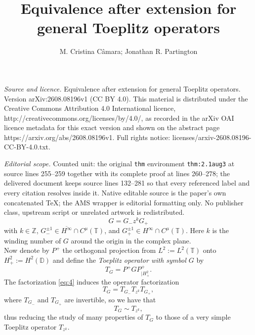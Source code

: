 \documentclass[10pt,a4paper]{amsart}
\def\DD{\mathbb D}
\def\TT{\mathbb T}
\def\ZZ{\mathbb Z}
\def\beq{\begin{equation}}
\def\eeq{\end{equation}}
\def\ol{\overline}
\begin{document}
\title[Equivalence after extension for general Toeplitz operators]{Equivalence after extension for general Toeplitz operators}
\author{M. Cristina Câmara; Jonathan R. Partington}
\date{}
\maketitle
\noindent\emph{Source and licence.} Equivalence after extension for general Toeplitz operators. Version arXiv:2608.08196v1 (CC BY 4.0). This material is distributed under the Creative Commons Attribution 4.0 International licence, http://creativecommons.org/licenses/by/4.0/, as recorded in the arXiv OAI licence metadata for this exact version and shown on the abstract page https://arxiv.org/abs/2608.08196v1. Full rights notice: licenses/arxiv-2608.08196-CC-BY-4.0.txt.\par\smallskip
\noindent\textit{Editorial scope.} Counted unit: the original \texttt{thm} environment \texttt{thm:2.1aug3} at source lines 255--259 together with its complete proof at lines 260--278; the delivered document keeps source lines 132--281 so that every referenced label and every citation resolves inside it. Native editable source is the paper's own concatenated TeX; the AMS wrapper is editorial formatting only. No publisher class, upstream script or unrelated artwork is redistributed.
\beq\label{eq:4}
G= G_- z^k G_+
\eeq
with $k \in \ZZ$, $G^{\pm 1}_- \in \ol{H^\infty} \cap C^\mu(\TT)$, and
$G^{\pm 1}_+ \in H^\infty \cap C^\mu(\TT)$.
Here $k$ is the winding number of $G$ around the origin in the complex plane.\\

Now denote by $P^+$ the orthogonal projection from $L^2:=L^2(\TT)$ onto $H^2_+:= H^2(\DD)$ and define the {\em Toeplitz operator with symbol $G$\/} by
\beq \label{eq:5}
T_G = P^+ G P^+_{| H^2_+}.
\eeq
The factorization \eqref{eq:4}
induces the operator factorization
\[
T_G = T_{G_-} T_{z^k} T_{G_+},
\] 
where $T_{G_-}$ and $T_{G_+}$ are invertible, so we have that
\[
T_G \sim T_{z^k},
\]
thus reducing the study of many properties of $T_G$ to those of a very simple Toeplitz operator $T_{z^k}$.\\
\end{document}
